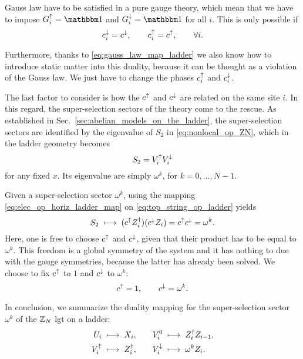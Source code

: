 Gauss law have to be satisfied in a pure gauge theory, which mean that we have to impose $G^\uparrow_i = \identity$ and $G^\downarrow_i = \identity$ for all $i$.
This is only possible if
\begin{equation}
    c^{\downarrow}_i = c^{\downarrow}, \qquad
    c^{\uparrow}_i = c^{\uparrow}, \qquad
    \forall i.
\end{equation}

Furthermore, thanks to \eqref{eq:gauss_law_map_ladder}  we also know how to introduce static matter into this duality, because it can be thought as a violation of the Gauss law.
We just have to change the phases $c^{\uparrow}_i$ and $c^{\downarrow}_i$.

The last factor to consider is how the $c^{\uparrow}$ and $c^{\downarrow}$ are related on the same site $i$.
In this regard, the super-selection sectors of the theory come to the rescue.
As established in Sec.~\ref{sec:abelian_models_on_the_ladder}, the super-selection sectors are identified by the eigenvalue of $S_2$ in \eqref{eq:nonlocal_op_ZN}, which in the ladder geometry becomes
\begin{equation}
    S_2 = V^{\uparrow}_i V^{\downarrow}_i
    \label{eq:top_string_op_ladder}
\end{equation}
for any fixed $x$.
Its eigenvalue are simply $\omega^k$, for $k = 0, \dots, N-1$.

Given a super-selection sector $\omega^k$, using the mapping \eqref{eq:elec_op_horiz_ladder_map} on \eqref{eq:top_string_op_ladder} yields
\begin{equation}
    S_2 \; \longmapsto \; ( c^{\uparrow} Z^\dagger_i ) ( c^{\downarrow} Z_i ) = c^{\uparrow} c^{\downarrow} = \omega^k.
\end{equation}
Here, one is free to choose $c^{\uparrow}$ and $c^{\downarrow}$, given that their product has to be equal to $\omega^k$.
This freedom is a global symmetry of the system and it has nothing to due with the gauge symmetries, because the latter has already been solved.
We choose to fix $c^{\uparrow}$ to $1$ and $c^{\downarrow}$ to $\omega^k$:
\begin{equation}
    c^{\uparrow} = 1, \qquad
    c^{\downarrow} = \omega^k.
\end{equation}

In conclusion, we summarize the duality mapping for the super-selection sector $\omega^k$ of the $\mathbb{Z}_N$ \ac{lgt} on a ladder:
\begin{equation}
    \begin{aligned}
       U_i      & \; \longmapsto \; X_i, \quad &
        V^0_i    & \; \longmapsto \; Z^\dagger_i Z_{i-1}, \\
        V^{\uparrow}_i   & \; \longmapsto \; Z_i^\dagger, \quad &
        V^{\downarrow}_i & \; \longmapsto \; \omega^k Z_i.
    \end{aligned}
    \label{eq:ladder_duality}
\end{equation}

